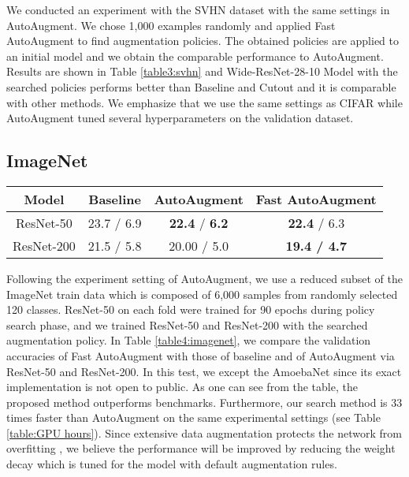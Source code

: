 \documentclass{article}
\begin{document}
We conducted an experiment with the SVHN dataset \cite{netzer2011reading} with the same settings in AutoAugment. We chose 1,000 examples randomly and applied Fast AutoAugment to find augmentation policies. The obtained policies are applied to an initial model and we obtain the comparable performance to AutoAugment. Results are shown in Table \ref{table3:svhn} and Wide-ResNet-28-10 Model with the searched policies performs better than Baseline and Cutout and it is comparable with other methods. We emphasize that we use the same settings as CIFAR while AutoAugment tuned several hyperparameters on the validation dataset. 

\subsection{ImageNet}

\begin{table*}[t!] \center
\vspace{3pt}
\begin{tabular}{c | c c | c}
\toprule
Model & Baseline & AutoAugment \cite{cubuk2018autoaugment} & Fast AutoAugment
\tabularnewline
\midrule
ResNet-50 & 23.7 / 6.9 & \textbf{22.4} / \textbf{6.2} & \textbf{22.4} / 6.3  \\
ResNet-200 & 21.5 / 5.8 & 20.00 / 5.0 & \textbf{19.4 / 4.7}
\tabularnewline
\bottomrule
\end{tabular}
\caption{Validation set Top-1 / Top-5 error rate (\%) on ImageNet.}
\label{table4:imagenet}
\end{table*}

Following the experiment setting of AutoAugment, we use a reduced subset of the ImageNet train data which is composed of 6,000 samples from randomly selected 120 classes. ResNet-50 \cite{he2016deep} on each fold were trained for 90 epochs during policy search phase, and we trained ResNet-50 \cite{he2016deep} and ResNet-200 \cite{he2016identity} with the searched augmentation policy. In Table \ref{table4:imagenet}, we compare the validation accuracies of Fast AutoAugment with those of baseline and of AutoAugment via ResNet-50 and ResNet-200. In this test, we except the AmoebaNet \cite{real2018regularized} since its exact implementation is not open to public. As one can see from the table, the proposed method outperforms benchmarks. Furthermore, our search method is 33 times faster than AutoAugment on the same experimental settings (see Table \ref{table:GPU hours}). Since extensive data augmentation protects the network from overfitting \cite{hernandez2018data}, we believe the performance will be improved by reducing the weight decay which is tuned for the model with default augmentation rules. 
\end{document}
